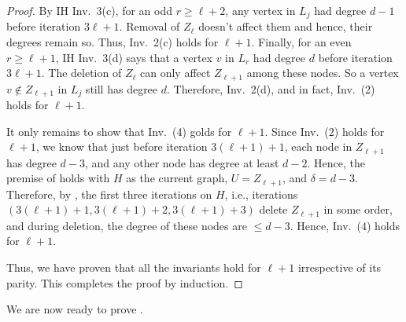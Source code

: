 \begin{proof}
 By IH Inv.~3(c), for an odd $r \geq \ell+2$, any vertex in $L_j$ had degree $d-1$ before iteration $3\ell+1$. Removal of $Z_{\ell}$ doesn't affect them and hence, their degrees remain so. Thus, Inv.~2(c) holds for $\ell+1$. Finally, for an even $r\geq \ell+1$, IH Inv.~3(d) says that a vertex $v$ in $L_r$ had degree $d$ before iteration $3\ell+1$. The deletion of $Z_{\ell}$ can only affect $Z_{\ell+1}$ among these nodes. So a vertex $v\not\in Z_{\ell+1}$ in $L_j$ still has degree $d$. Therefore, Inv.~2(d), and in fact, Inv.~(2) holds for $\ell+1$.

It only remains to show that Inv.~(4) golds for $\ell+1$. Since Inv.~(2) holds for $\ell+1$, we know that just before iteration $3(\ell+1)+1$, each node in $Z_{\ell+1}$ has degree $d-3$, and any other node has degree at least $d-2$. Hence, the premise of  holds with $H$ as the current graph, $U=Z_{\ell+1}$, and $\delta=d-3$. Therefore, by , the first three iterations on $H$, i.e., iterations $(3(\ell+1)+1,3(\ell+1)+2,3(\ell+1)+3)$ delete $Z_{\ell+1}$ in some order, and during deletion, the degree of these nodes are $\leq d-3$. Hence, Inv.~(4) holds for $\ell+1$.

Thus, we have proven that all the invariants hold for $\ell+1$ irrespective of its parity. This completes the proof by induction.
\end{proof}
 
 
 

 We are now ready to prove .





